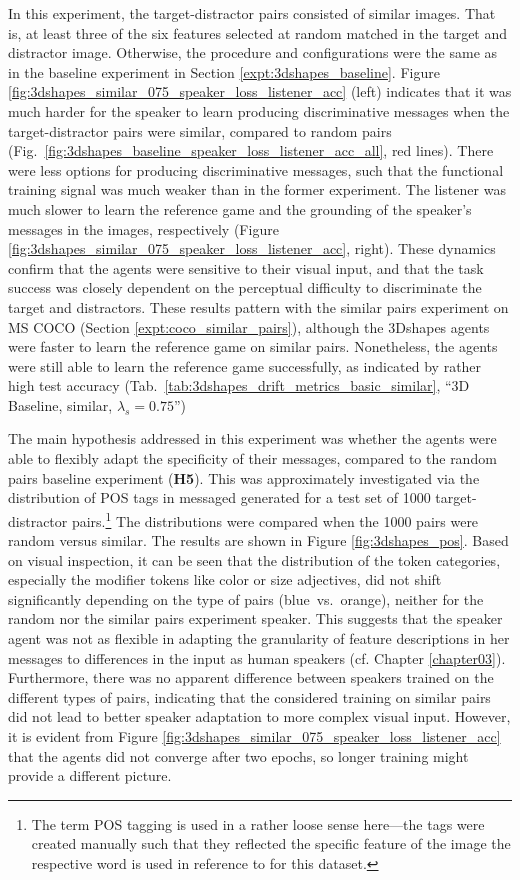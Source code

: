 In this experiment, the target-distractor pairs consisted of similar images. That is, at least three of the six features selected at random matched in the target and distractor image. Otherwise, the procedure and configurations were the same as in the baseline experiment in Section \ref{expt:3dshapes_baseline}. 
Figure \ref{fig:3dshapes_similar_075_speaker_loss_listener_acc} (left) indicates that it was much harder for the speaker to learn producing discriminative messages when the target-distractor pairs were similar, compared to random pairs (Fig.~\ref{fig:3dshapes_baseline_speaker_loss_listener_acc_all}, red lines). There were less options for producing discriminative messages, such that the functional training signal was much weaker than in the former experiment. The listener was much slower to learn the reference game and the grounding of the speaker's messages in the images, respectively (Figure \ref{fig:3dshapes_similar_075_speaker_loss_listener_acc}, right). These dynamics confirm that the agents were sensitive to their visual input, and that the task success was closely dependent on the perceptual difficulty to discriminate the target and distractors. These results pattern with the similar pairs experiment on MS COCO (Section \ref{expt:coco_similar_pairs}), although the 3Dshapes agents were faster to learn the reference game on similar pairs. Nonetheless, the agents were still able to learn the reference game successfully, as indicated by rather high test accuracy (Tab.~\ref{tab:3dshapes_drift_metrics_basic_similar}, ``3D Baseline, similar, $\lambda_s = 0.75$'')

The main hypothesis addressed in this experiment was whether the agents were able to flexibly adapt the specificity of their messages, compared to the random pairs baseline experiment (\textbf{H5}). This was approximately investigated via the distribution of POS tags in messaged generated for a test set of 1000 target-distractor pairs.\footnote{The term POS tagging is used in a rather loose sense here---the tags were created manually such that they reflected the specific feature of the image the respective word is used in reference to for this dataset.} The distributions were compared when the 1000 pairs were random versus similar. The results are shown in Figure \ref{fig:3dshapes_pos}. Based on visual inspection, it can be seen that the distribution of the token categories, especially the modifier tokens like color or size adjectives, did not shift significantly depending on the type of pairs (blue~vs.~orange), neither for the random nor the similar pairs experiment speaker. This suggests that the speaker agent was not as flexible in adapting the granularity of feature descriptions in her messages to differences in the input as human speakers (cf. Chapter \ref{chapter03}). Furthermore, there was no apparent difference between speakers trained on the different types of pairs, indicating that the considered training on similar pairs did not lead to better speaker adaptation to more complex visual input. However, it is evident from Figure \ref{fig:3dshapes_similar_075_speaker_loss_listener_acc} that the agents did not converge after two epochs, so longer training might provide a different picture.

